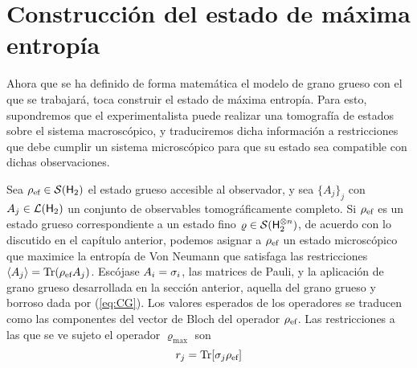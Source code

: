 \section{Construcción del estado de máxima entropía}
\label{sec:maxentcons}

Ahora que se ha definido de forma matemática el modelo de grano grueso con el que se trabajará, toca construir el estado de máxima entropía. Para esto, supondremos que el experimentalista puede realizar una tomografía de estados sobre el sistema macroscópico, y traduciremos dicha información a restricciones que debe cumplir un sistema microscópico para que su estado sea compatible con dichas observaciones. 

Sea $\rho_{\text{ef}}\in\mathcal{S}({\sf H}_{2})$ el estado grueso accesible al observador, y sea $\{A_{j}\}_{j}$ con $A_{j}\in\mathcal{L}({\sf H}_{2})$ un conjunto de observables tomográficamente completo.
Si $\rho_{\text{ef}}$ es un estado grueso correspondiente a un estado fino $\varrho\in\mathcal{S}({\sf H}_{2}^{\otimes n})$, de acuerdo con lo discutido en el capítulo anterior, podemos asignar a $\rho_{\text{ef}}$ un estado microscópico que maximice la entropía de Von Neumann que satisfaga las restricciones $\expval{A_{j}}=\Tr(\rho_{\text{ef}} A_{j})$.
Escójase ${A_{i}}={\sigma_{i}}$, las matrices de Pauli, y la aplicación de grano grueso desarrollada en la sección anterior, aquella del grano grueso y borroso dada por (\ref{eq:CG}). Los valores esperados de los operadores se traducen como las componentes del vector de Bloch del operador $\rho_{\text{ef}}$. Las restricciones a las que se ve sujeto el operador $\varrho_{\max}$ son
\begin{equation}\label{eq:Restrictions}
    r_{j}=\Tr[\sigma_{j}\rho_{\text{ef}}]
\end{equation}

